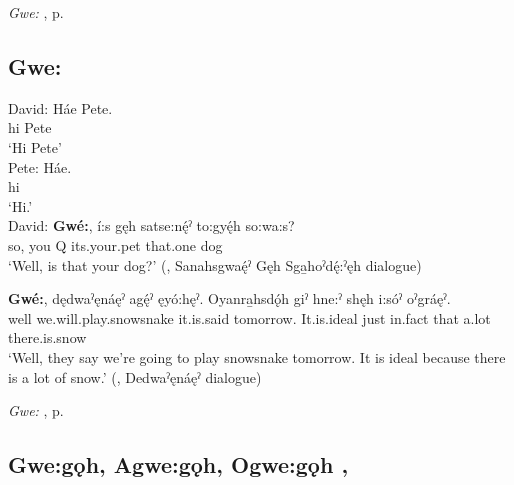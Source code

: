 \begin{CayugaRelated}
\item \textit{Gwe:} , p. \pageref{p:[gwe:] ‘well, …’}
\end{CayugaRelated}


\subsection*{\textbf{Gwe:} } \label{p:[gwe:] ‘well, …’}

\ea
\label{ex:gpar115} 
\gll David:  Háe Pete. \\
{} hi Pete\\
\glt ‘Hi Pete’\\
 
\gll Pete: Háe. \\
{} hi\\
\glt ‘Hi.’\\

\gll David: \textbf{Gwé:}, í:s gęh satse:nę́ˀ to:gyę́h so:wa:s?\\
{} so, you Q its.your.pet that.one dog\\
\glt ‘Well, is that your dog?’ (\cite[317]{mithun_watewayestanih_1984}, Sanahsgwaę́ˀ Gęh Sga̱hoˀdę́:ˀęh dialogue)
\z

\ea
\label{ex:gpar116}
\gll \textbf{Gwé:}, dędwaˀęnáęˀ agę́ˀ ęyó:hęˀ. Oyanra̱hsdǫ́h giˀ hne:ˀ shęh i:sóˀ oˀgráęˀ.\\
well we.will.play.snowsnake it.is.said tomorrow. It.is.ideal just in.fact that a.lot there.is.snow\\
\glt ‘Well, they say we’re going to play snowsnake tomorrow. It is ideal because there is a lot of snow.’ (\cite[481]{mithun_watewayestanih_1984}, Dedwaˀęnáęˀ dialogue)
\z


\begin{CayugaRelated}
\item \textit{Gwe:} , p. \pageref{p:[gwe:] ‘well!’}
\end{CayugaRelated}


\subsection*{\textbf{Gwe:gǫh, Agwe:gǫh, Ogwe:gǫh} , } \label{p:[gwe:gǫh] ‘all’}

